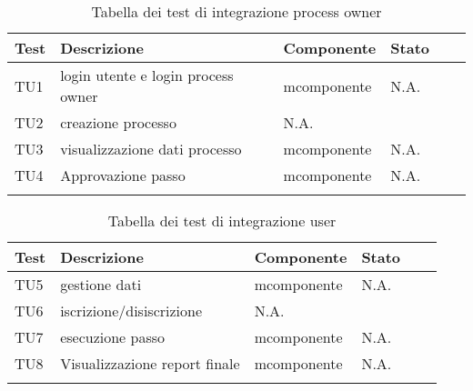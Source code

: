 \begin{longtable}{llllXr}
\toprule
\textbf{Test} & \textbf{Descrizione} & \textbf{Componente} & \textbf{Stato}\\
\toprule
TU1&login utente e login process owner &mcomponente&N.A.\\
\midrule
TU2&creazione processo&N.A.\\
\midrule
TU3&visualizzazione dati processo&mcomponente&N.A.\\
\midrule
TU4&Approvazione passo&mcomponente&N.A.\\
\bottomrule
\caption{Tabella dei test di integrazione process owner}
\end{longtable}
\begin{longtable}{llllXr}%
\toprule
\textbf{Test} & \textbf{Descrizione} & \textbf{Componente} & \textbf{Stato}\\
\toprule
TU5&gestione dati&mcomponente&N.A.\\
\midrule
TU6&iscrizione/disiscrizione&N.A.\\
\midrule
TU7&esecuzione passo&mcomponente&N.A.\\
\midrule
TU8&Visualizzazione report finale&mcomponente&N.A.\\
\bottomrule
\caption{Tabella dei test di integrazione user}
\end{longtable}